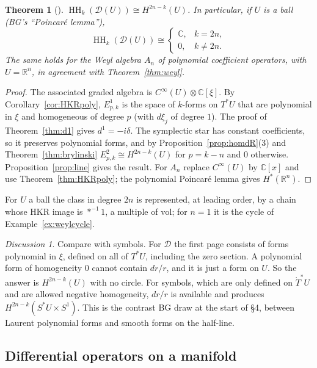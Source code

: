 \documentclass[11pt,oneside,reqno]{article}
\DeclareMathOperator{\HH}{HH}
\newcommand{\C}{\mathbb C}
\newcommand{\R}{\mathbb R}
\newcommand{\cD}{\mathcal D}
\newcommand{\CI}{C^\infty}
\newcommand{\Tdot}{\dot T^*}
\newcommand{\vol}{\mathrm{vol}}
\theoremstyle{plain}
\newtheorem{theorem}{Theorem}[section]
\theoremstyle{definition}
\theoremstyle{remark}
\newtheorem*{discussion}{Discussion}
\begin{document}
\begin{theorem}[{\cite[\S5]{BG}}]\label{thm:DU}
\(\HH_k(\cD(U))\cong H^{2n-k}(U)\). In particular, if \(U\) is a ball (BG's ``Poincaré
lemma''),
\[
 \HH_k(\cD(U))\cong\begin{cases}\C,&k=2n,\\0,&k\ne2n.\end{cases}
\]
The same holds for the Weyl algebra \(A_n\) of polynomial coefficient operators, with
\(U=\R^n\), in agreement with Theorem~\ref{thm:weyl}.
\end{theorem}

\begin{proof}
The associated graded algebra is \(\CI(U)\otimes\C[\xi]\). By
Corollary~\ref{cor:HKRpoly}, \(E^1_{p,k}\) is the space of \(k\)-forms on \(T^*U\) that are
polynomial in \(\xi\) and homogeneous of degree \(p\) (with \(d\xi_j\) of degree \(1\)). The proof
of Theorem~\ref{thm:d1} gives \(d^1=-i\delta\). The symplectic star has constant
coefficients, so it preserves polynomial forms, and by
Proposition~\ref{prop:homdR}(3) and Theorem~\ref{thm:brylinski}
\(E^2_{p,k}\cong H^{2n-k}(U)\) for \(p=k-n\) and \(0\) otherwise. Proposition~\ref{prop:line}
gives the result. For \(A_n\) replace \(\CI(U)\) by \(\C[x]\) and use
Theorem~\ref{thm:HKRpoly}; the polynomial Poincaré lemma gives \(H^*(\R^n)\).
\end{proof}

For \(U\) a ball the class in degree \(2n\) is represented, at leading order, by a chain
whose HKR image is \(*^{-1}1\), a multiple of \(\vol\); for \(n=1\) it is the cycle of
Example~\ref{ex:weylcycle}.

\begin{discussion}
Compare with symbols. For \(\cD\) the first page consists of forms polynomial in
\(\xi\), defined on all of \(T^*U\), including the zero section. A polynomial form of
homogeneity \(0\) cannot contain \(dr/r\), and it is just a form on \(U\). So the answer
is \(H^{2n-k}(U)\) with no circle. For symbols, which are only defined on \(\Tdot U\) and
are allowed negative homogeneity, \(dr/r\) is available and produces
\(H^{2n-k}(S^*U\times S^1)\). This is the contrast BG draw at the start of \S4, between
Laurent polynomial forms and smooth forms on the half-line.
\end{discussion}

\subsection{Differential operators on a manifold}\label{subsec:DM}
\end{document}
